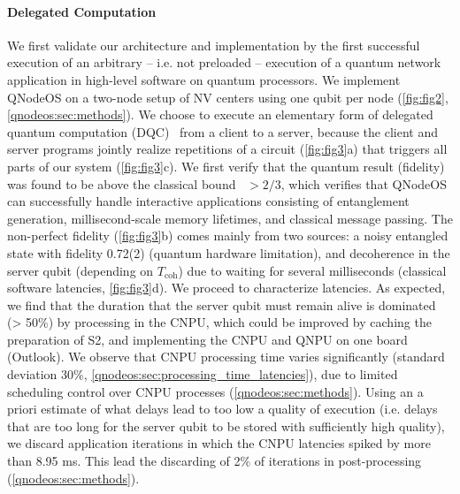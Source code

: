 \paragraph{Delegated Computation}
We first validate our architecture and implementation by the first successful execution of an arbitrary – i.e. not preloaded – execution of a quantum network application in high-level software on quantum processors. We implement QNodeOS on a two-node setup of NV centers using one qubit per node (\cref{fig:fig2}, \cref{qnodeos:sec:methods}). We choose to execute an elementary form of delegated quantum computation (DQC)~\cite{broadbent_2009_ubqc} from a client to a server, because the client and server programs jointly realize repetitions of a circuit (\cref{fig:fig3}a) that triggers all parts of our system (\cref{fig:fig3}c). 
We first verify that the quantum result (fidelity) was found to be above the classical bound~\cite{massar_optimal_1995} $> 2/3$, which verifies that QNodeOS can successfully handle interactive applications consisting of entanglement generation, millisecond-scale memory lifetimes, and classical message passing. The non-perfect fidelity (\cref{fig:fig3}b) comes mainly from two sources: a noisy entangled state with fidelity 0.72(2) (quantum hardware limitation), and decoherence in the server qubit (depending on $T_{\text{coh}}$) due to waiting for several milliseconds (classical software latencies, \cref{fig:fig3}d).
We proceed to characterize latencies. As expected, we find that the duration that the server qubit must remain alive is dominated (> 50\%) by processing in the CNPU, which could be improved by caching the preparation of S2, and implementing the CNPU and QNPU on one board (Outlook). We observe that CNPU processing time varies significantly (standard deviation 30\%, \cref{qnodeos:sec:processing_time_latencies}), due to limited scheduling control over CNPU processes (\cref{qnodeos:sec:methods}).  Using an a priori estimate of what delays lead to too low a quality of execution (i.e. delays that are too long for the server qubit to be stored with sufficiently high quality), we discard application iterations in which the CNPU latencies spiked by more than 8.95 ms. This lead the discarding of 2\% of iterations in post-processing (\cref{qnodeos:sec:methods}).

